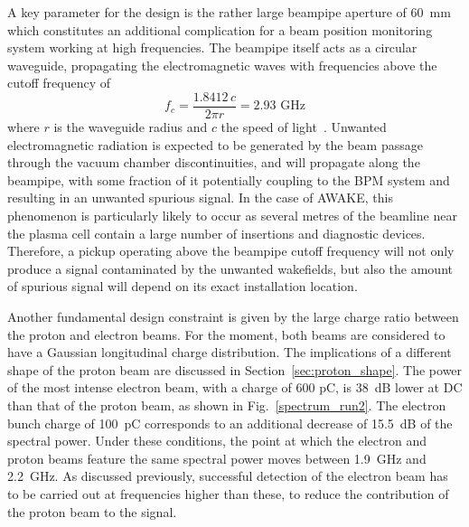 A key parameter for the design is the rather large beampipe aperture of 60~mm which constitutes an additional complication for a beam position monitoring system working at high frequencies. The beampipe itself acts as a circular waveguide, propagating the electromagnetic waves with frequencies above the cutoff frequency of
\begin{equation}
f_c = \frac{1.8412 \,c}{2 \pi r} = 2.93\text{ GHz}
\end{equation}
where $r$ is the waveguide radius and $c$ the speed of light~\cite{Jackson:490457}. Unwanted electromagnetic radiation is expected to be generated by the beam passage through the vacuum chamber discontinuities, and will propagate along the beampipe, with some fraction of it potentially coupling to the BPM system and resulting in an unwanted spurious signal. In the case of AWAKE, this phenomenon is particularly likely to occur as several metres of the beamline near the plasma cell contain a large number of insertions and diagnostic devices. Therefore, a pickup operating above the beampipe cutoff frequency  will not only produce a signal contaminated by the unwanted wakefields, but also the amount of spurious signal will depend on its exact installation location.

Another fundamental design constraint is given by the large charge ratio between the proton and electron beams. For the moment, both beams are considered to have a Gaussian longitudinal charge distribution. The implications of a different shape of the proton beam are discussed in Section~\ref{sec:proton_shape}. 
The power of the most intense electron beam, with a charge of 600 pC, is 38~dB lower at DC than that of the proton beam, as shown in Fig.~\ref{spectrum_run2}. The electron bunch charge of 100~pC corresponds to an additional decrease of 15.5~dB of the spectral power. Under these conditions, the point at which the electron and proton beams feature the same spectral power moves between 1.9~GHz and 2.2~GHz. As discussed previously, successful detection of the electron beam has to be carried out at frequencies higher than these, to reduce the contribution of the proton beam to the signal. 


